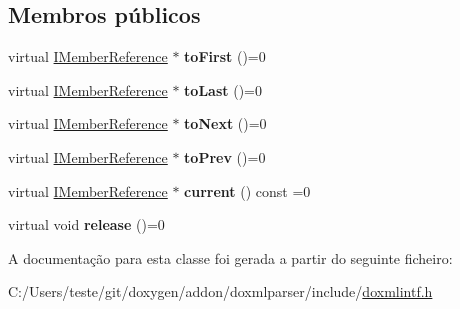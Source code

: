 \subsection*{Membros públicos}
\begin{DoxyCompactItemize}
\item 
\hypertarget{class_i_member_reference_iterator_a376ee9c0c65e3612c0ada72a5a4bc227}{virtual \hyperlink{class_i_member_reference}{I\-Member\-Reference} $\ast$ {\bfseries to\-First} ()=0}\label{class_i_member_reference_iterator_a376ee9c0c65e3612c0ada72a5a4bc227}

\item 
\hypertarget{class_i_member_reference_iterator_ad54a933b0be08e133d0b1361fe3ac530}{virtual \hyperlink{class_i_member_reference}{I\-Member\-Reference} $\ast$ {\bfseries to\-Last} ()=0}\label{class_i_member_reference_iterator_ad54a933b0be08e133d0b1361fe3ac530}

\item 
\hypertarget{class_i_member_reference_iterator_ae336cea93d20ce4bec7209b5bb8227cc}{virtual \hyperlink{class_i_member_reference}{I\-Member\-Reference} $\ast$ {\bfseries to\-Next} ()=0}\label{class_i_member_reference_iterator_ae336cea93d20ce4bec7209b5bb8227cc}

\item 
\hypertarget{class_i_member_reference_iterator_ac1c8afda52d200de8eeb4d90e0708f6d}{virtual \hyperlink{class_i_member_reference}{I\-Member\-Reference} $\ast$ {\bfseries to\-Prev} ()=0}\label{class_i_member_reference_iterator_ac1c8afda52d200de8eeb4d90e0708f6d}

\item 
\hypertarget{class_i_member_reference_iterator_a3356d3301ca81d82efe79a0425a5241e}{virtual \hyperlink{class_i_member_reference}{I\-Member\-Reference} $\ast$ {\bfseries current} () const =0}\label{class_i_member_reference_iterator_a3356d3301ca81d82efe79a0425a5241e}

\item 
\hypertarget{class_i_member_reference_iterator_aab0a52fdd148a54108e7bf49287d7c47}{virtual void {\bfseries release} ()=0}\label{class_i_member_reference_iterator_aab0a52fdd148a54108e7bf49287d7c47}

\end{DoxyCompactItemize}


A documentação para esta classe foi gerada a partir do seguinte ficheiro\-:\begin{DoxyCompactItemize}
\item 
C\-:/\-Users/teste/git/doxygen/addon/doxmlparser/include/\hyperlink{include_2doxmlintf_8h}{doxmlintf.\-h}\end{DoxyCompactItemize}
